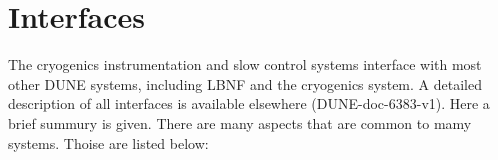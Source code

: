 \section{Interfaces}
\label{sec:fdsp-slow-cryo-intfc}



The cryogenics instrumentation and slow control systems interface with most other DUNE systems, including LBNF and the cryogenics system.
A detailed description of all interfaces is available elsewhere (DUNE-doc-6383-v1). Here a brief summury is given. 
There are many aspects that are common to mamy systems. Thoise are listed below: 





  
